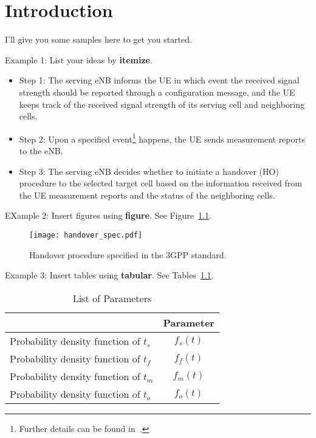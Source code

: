 \chapter{Introduction}
\label{intro}
	
I'll give you some samples here to get you started.\par

Example 1: List your ideas by \textbf{itemize}. 
\begin{itemize}
	\item Step 1: The serving eNB informs the UE in which event the received signal strength should be reported through a configuration message, and the UE keeps track of the received signal strength of its serving cell and neighboring cells.
	\item Step 2: Upon a specified event\footnote{Further details can be found in~\cite{ts36.331}.} happens, the UE sends measurement reports to the eNB.
	\item Step 3: The serving eNB decides whether to initiate a handover (HO) procedure to the selected target cell based on the information received from the UE measurement reports and the status of the neighboring cells.
\end{itemize}



EXample 2: Insert figures using \textbf{figure}. See Figure~\ref{fig:HandoverSpec}.
	
\begin{figure}[t]
	\vspace{-3mm}
	\graphicspath{ {../Figures/} } 
	\centering 
	\texttt{[image: handover\_spec.pdf]} 
	\caption{Handover procedure specified in the 3GPP standard.} 
	\label{fig:HandoverSpec} 
	\vspace{-5mm}
\end{figure}

Example 3: Insert tables using \textbf{tabular}. See Tables~\ref{tab:ParameterSetting}.

\begin{table}[t]
	\caption{List of Parameters}
	\centering  
	\label{tab:ParameterSetting}		
	\begin{tabular}{| p{6.5cm}|c|}
		\hline
		                                                          & \textbf{Parameter} \\ \hline\hline
		Probability density function of $t_s$                     &      $f_s(t)$      \\ \hline
		Probability density function of $t_{f}$                   &     $f_{f}(t)$     \\ \hline
		Probability density function of $t_{m}$                   &     $f_{m}(t)$     \\ \hline
		Probability density function of $t_{o}$                   &     $f_{o}(t)$     \\ \hline
	\end{tabular}
\end{table}

